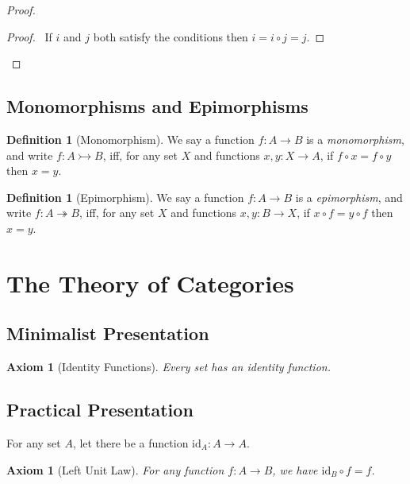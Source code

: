 \documentclass{book}
\let\qed\relax
\newtheorem{ax}[prop]{Axiom}
\theoremstyle{definition}
\newtheorem{df}[prop]{Definition}
\newcommand{\id}[1]{\ensuremath{\mathrm{id}_{#1}}}
\begin{document}
\begin{proof}
\pf
{}
\begin{proof}
	\pf\ If $i$ and $j$ both satisfy the conditions then $i = i \circ j = j$.
\end{proof}
\qed
\end{proof}

\subsection{Monomorphisms and Epimorphisms}

\begin{df}[Monomorphism]
We say a function $f : A \rightarrow B$ is a \emph{monomorphism}, and write $f : A \rightarrowtail B$, iff, for any set $X$ and functions $x,y : X \rightarrow A$, if $f \circ x = f \circ y$ then $x = y$.
\end{df}

\begin{df}[Epimorphism]
We say a function $f : A \rightarrow B$ is a \emph{epimorphism}, and write $f : A \twoheadrightarrow B$, iff, for any set $X$ and functions $x,y : B \rightarrow X$, if $x \circ f = y \circ f$ then $x = y$.
\end{df}

\section{The Theory of Categories}

\subsection{Minimalist Presentation}

\begin{ax}[Identity Functions]
Every set has an identity function.
\end{ax}

\subsection{Practical Presentation}

For any set $A$, let there be a function $\id{A} : A \rightarrow A$.

\begin{ax}[Left Unit Law]
For any function $f : A \rightarrow B$, we have $\id{B} \circ f = f$.
\end{ax}
\end{document}

